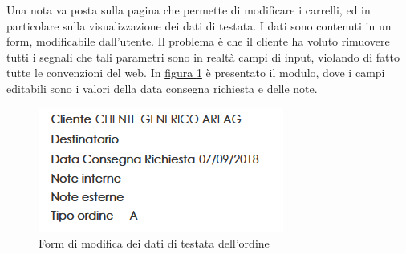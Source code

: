 Una nota va posta sulla pagina che permette di modificare i carrelli, ed in particolare sulla visualizzazione dei dati di testata. I dati sono contenuti in un form, modificabile dall'utente. Il problema è che il cliente ha voluto rimuovere tutti i segnali che tali parametri sono in realtà campi di input, violando di fatto tutte le convenzioni del web. In \hyperref[fig:carrello-form]{figura \ref{fig:carrello-form}} è presentato il modulo, dove i campi editabili sono i valori della data consegna richiesta e delle note.
\begin{figure}[H]
	\centering
	\includegraphics[width=0.5\linewidth]{Immagini/p2/carrello-form.png}
	\caption{Form di modifica dei dati di testata dell'ordine}
	\label{fig:carrello-form}
\end{figure}